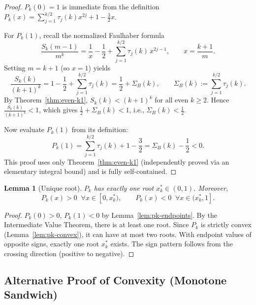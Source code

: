 \documentclass[12pt,a4paper]{article}
\theoremstyle{plain}
\newtheorem{lemma}[theorem]{Lemma}
\theoremstyle{definition}
\begin{document}
\begin{proof}
  $P_k(0) = 1$ is immediate from the definition
  $P_k(x) = \sum_{j=1}^{k/2} \tau_j(k) x^{2j} + 1 - \frac{3}{2}x$.

  For $P_k(1)$, recall the normalized Faulhaber formula
  \[
    \frac{S_k(m-1)}{m^k}
    = \frac{1}{x} - \frac{1}{2}
    + \sum_{j=1}^{k/2} \tau_j(k) \, x^{2j-1},
    \qquad x = \frac{k+1}{m}.
  \]
  Setting $m = k+1$ (so $x = 1$) yields
  \[
    \frac{S_k(k)}{(k+1)^k}
    = 1 - \frac{1}{2} + \sum_{j=1}^{k/2} \tau_j(k)
    = \frac{1}{2} + \Sigma_B(k),
    \qquad \Sigma_B(k) := \sum_{j=1}^{k/2} \tau_j(k).
  \]
  By Theorem~\ref{thm:even-k1}, $S_k(k) < (k+1)^k$ for all even $k \ge 2$.
  Hence $\frac{S_k(k)}{(k+1)^k} < 1$, which gives
  $\frac{1}{2} + \Sigma_B(k) < 1$, i.e., $\Sigma_B(k) < \frac{1}{2}$.

  Now evaluate $P_k(1)$ from its definition:
  \[
    P_k(1) = \sum_{j=1}^{k/2} \tau_j(k) + 1 - \frac{3}{2}
           = \Sigma_B(k) - \frac{1}{2}
           < 0.
  \]
  This proof uses only Theorem~\ref{thm:even-k1} (independently proved
  via an elementary integral bound) and is fully self-contained.
\end{proof}

\begin{lemma}[Unique root]\label{lem:pk-unique-root}
  $P_k$ has exactly one root $x^*_k \in (0, 1)$.  Moreover,
  \begin{equation}\label{eq:pk-sign-pattern}
    P_k(x) > 0 \;\; \forall x \in [0, x^*_k), \qquad
    P_k(x) < 0 \;\; \forall x \in (x^*_k, 1].
  \end{equation}
\end{lemma}

\begin{proof}
  $P_k(0) > 0$, $P_k(1) < 0$ by Lemma~\ref{lem:pk-endpoints}.
  By the Intermediate Value Theorem, there is at least one root.
  Since $P_k$ is strictly convex (Lemma~\ref{lem:pk-convex}), it can
  have at most two roots.  With endpoint values of opposite signs,
  exactly one root $x^*_k$ exists.  The sign pattern follows from the
  crossing direction (positive to negative).
\end{proof}

\subsection*{Alternative Proof of Convexity (Monotone Sandwich)}
\label{sec:alt-lemma72}
\end{document}
